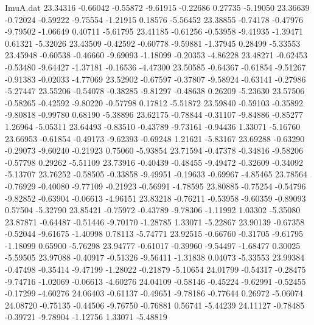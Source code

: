 \begin{filecontents}{ImuA.dat}
  23.34316   -0.66042   -0.55872   -9.61915   -0.22686    0.27735   -5.19050
  23.36639   -0.72024   -0.59222   -9.75554   -1.21915    0.18576   -5.56452
  23.38855   -0.74178   -0.47976   -9.79502   -1.06649    0.40711   -5.61795
  23.41185   -0.61256   -0.53958   -9.41935   -1.39471    0.61321   -5.32026
  23.43509   -0.42592   -0.60778   -9.59881   -1.37945    0.28499   -5.33553
  23.45948   -0.60538   -0.46660   -9.69093   -1.18099   -0.20353   -4.86228
  23.48271   -0.62453   -0.53480   -9.64427   -1.37181   -0.16536   -4.47300
  23.50585   -0.64367   -0.61854   -9.51267   -0.91383   -0.02033   -4.77069
  23.52902   -0.67597   -0.37807   -9.58924   -0.63141   -0.27986   -5.27447
  23.55206   -0.54078   -0.38285   -9.81297   -0.48638    0.26209   -5.23630
  23.57506   -0.58265   -0.42592   -9.80220   -0.57798    0.17812   -5.51872
  23.59840   -0.59103   -0.35892   -9.80818   -0.99780    0.68190   -5.38896
  23.62175   -0.78844   -0.31107   -9.84886   -0.85277    1.26964   -5.05311
  23.64493   -0.83510   -0.43789   -9.73161   -0.94436    1.33071   -5.16760
  23.66953   -0.61854   -0.49173   -9.62393   -0.69248    1.21621   -5.83167
  23.69288   -0.63290   -0.29073   -9.60240   -0.21923    0.75060   -5.93854
  23.71594   -0.47378   -0.34816   -9.58206   -0.57798    0.29262   -5.51109
  23.73916   -0.40439   -0.48455   -9.49472   -0.32609   -0.34092   -5.13707
  23.76252   -0.58505   -0.33858   -9.49951   -0.19633   -0.69967   -4.85465
  23.78564   -0.76929   -0.40080   -9.77109   -0.21923   -0.56991   -4.78595
  23.80885   -0.75254   -0.54796   -9.82852   -0.63904   -0.06613   -4.96151
  23.83218   -0.76211   -0.53958   -9.60359   -0.89093    0.57504   -5.32790
  23.85421   -0.75972   -0.43789   -9.78306   -1.11992    1.03302   -5.35080
  23.87871   -0.64487   -0.51446   -9.70170   -1.28785    1.33071   -5.22867
  23.90139   -0.67358   -0.52044   -9.61675   -1.40998    0.78113   -5.74771
  23.92515   -0.66760   -0.31705   -9.61795   -1.18099    0.65900   -5.76298
  23.94777   -0.61017   -0.39960   -9.54497   -1.68477    0.30025   -5.59505
  23.97088   -0.40917   -0.51326   -9.56411   -1.31838    0.04073   -5.33553
  23.99384   -0.47498   -0.35414   -9.47199   -1.28022   -0.21879   -5.10654
  24.01799   -0.54317   -0.28475   -9.74716   -1.02069   -0.06613   -4.60276
  24.04109   -0.58146   -0.45224   -9.62991   -0.52455   -0.17299   -4.60276
  24.06403   -0.61137   -0.49651   -9.78186   -0.77644    0.26972   -5.06074
  24.08720   -0.75135   -0.44506   -9.76750   -0.76881    0.56741   -5.44239
  24.11127   -0.78485   -0.39721   -9.78904   -1.12756    1.33071   -5.48819

\end{filecontents}
